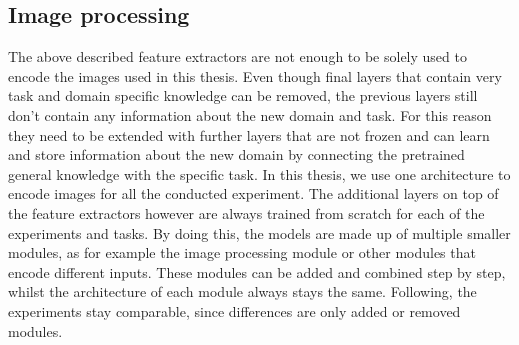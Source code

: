
\subsection{Image processing}
\label{sec:image-processing}

The above described feature extractors are not enough to be solely used to encode the images used in this thesis.
Even though final layers that contain very task and domain specific knowledge can be removed, the previous layers still don't contain any information about the new domain and task.
For this reason they need to be extended with further layers that are not frozen and can learn and store information about the new domain by connecting the pretrained general knowledge with the specific task.
In this thesis, we use one architecture to encode images for all the conducted experiment.
The additional layers on top of the feature extractors however are always trained from scratch for each of the experiments and tasks.
By doing this, the models are made up of multiple smaller modules, as for example the image processing module or other modules that encode different inputs.
These modules can be added and combined step by step, whilst the architecture of each module always stays the same.
Following, the experiments stay comparable, since differences are only added or removed modules.

